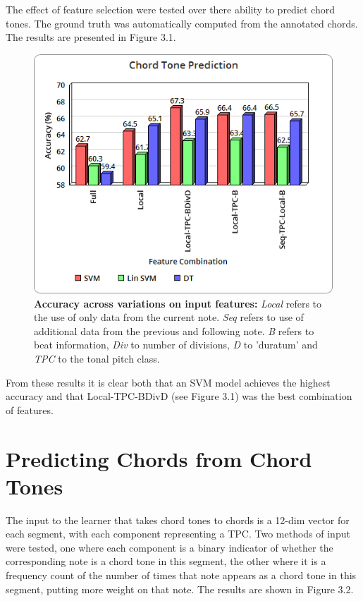 \documentclass[bsc,singlespacing,parskip,deptreport,twoside,frontabs]{infthesis}
\begin{document}
The effect of feature selection were tested over there ability to predict chord tones. The ground truth was automatically computed from the annotated chords. The results are presented in Figure 3.1. 

\begin{figure}
  \caption{\textbf{Accuracy across variations on input features:} \emph{Local} refers to the use of only data from the current note. \emph{Seq} refers to use of additional data from the previous and following note. \emph{B} refers to beat information, \emph{Div} to number of divisions, \emph{D} to 'duratum' and \emph{TPC} to the tonal pitch class.}
  \centering
    \includegraphics[scale=0.5]{ct1}
\end{figure}

From these results it is clear both that an SVM model achieves the highest accuracy and that Local-TPC-BDivD (see Figure 3.1) was the best combination of features.

\section{Predicting Chords from Chord Tones}

The input to the learner that takes chord tones to chords is a 12-dim vector for each segment, with each component representing a TPC. Two methods of input were tested, one where each component is a binary indicator of whether the corresponding note is a chord tone in this segment, the other where it is a frequency count of the number of times that note appears as a chord tone in this segment, putting more weight on that note. The results are shown in Figure 3.2.
\end{document}
